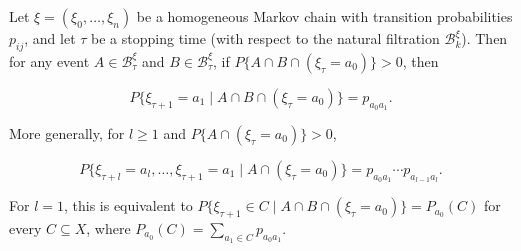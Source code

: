 Let $\xi = (\xi_0, \ldots, \xi_n)$ be a homogeneous Markov chain with transition probabilities $p_{ij}$, and let $\tau$ be a stopping time (with respect to the natural filtration $\mathcal{B}_k^\xi$). Then for any event $A \in \mathcal{B}_\tau^\xi$ and $B \in \mathcal{B}_\tau^\xi$, if $P\{A \cap B \cap (\xi_\tau = a_0)\} > 0$, then

$$P\{\xi_{\tau+1} = a_1 \mid A \cap B \cap (\xi_\tau = a_0)\} = p_{a_0 a_1}.$$

More generally, for $l \geq 1$ and $P\{A \cap (\xi_\tau = a_0)\} > 0$,

$$P\{\xi_{\tau+l} = a_l, \ldots, \xi_{\tau+1} = a_1 \mid A \cap (\xi_\tau = a_0)\} = p_{a_0 a_1} \cdots p_{a_{l-1} a_l}.$$

For $l = 1$, this is equivalent to $P\{\xi_{\tau+1} \in C \mid A \cap B \cap (\xi_\tau = a_0)\} = P_{a_0}(C)$ for every $C \subseteq X$, where $P_{a_0}(C) = \sum_{a_1 \in C} p_{a_0 a_1}$.
